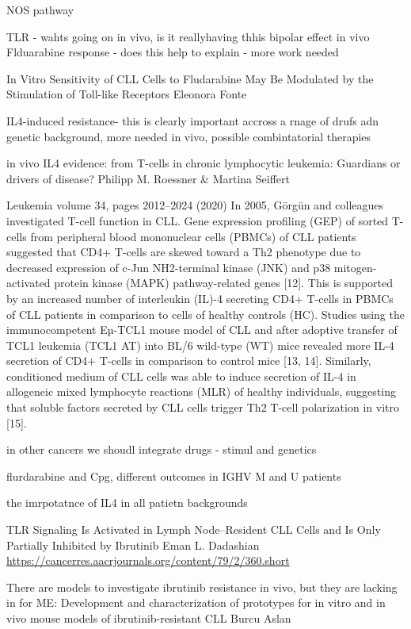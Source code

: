 \documentclass[11pt, a4paper, twosided]{book}
\begin{document}
NOS pathway

TLR - wahts going on in vivo, is it reallyhaving thhis bipolar effect in vivo
Flduarabine response - does this help to explain - more work needed

In Vitro Sensitivity of CLL Cells to Fludarabine May Be Modulated by the Stimulation of Toll-like Receptors
Eleonora Fonte

IL4-induced resistance- this is clearly important accross a rnage of drufs adn genetic background, more needed in vivo, possible combintatorial therapies

in vivo IL4 evidence:
from T-cells in chronic lymphocytic leukemia: Guardians or drivers of disease?
Philipp M. Roessner \& Martina Seiffert

Leukemia volume 34, pages 2012--2024 (2020)
In 2005, Görgün and colleagues investigated T-cell function in CLL. Gene expression profiling (GEP) of sorted T-cells from peripheral blood mononuclear cells (PBMCs) of CLL patients suggested that CD4+ T-cells are skewed toward a Th2 phenotype due to decreased expression of c-Jun NH2-terminal kinase (JNK) and p38 mitogen-activated protein kinase (MAPK) pathway-related genes {[}12{]}. This is supported by an increased number of interleukin (IL)-4 secreting CD4+ T-cells in PBMCs of CLL patients in comparison to cells of healthy controls (HC). Studies using the immunocompetent Eµ-TCL1 mouse model of CLL and after adoptive transfer of TCL1 leukemia (TCL1 AT) into BL/6 wild-type (WT) mice revealed more IL-4 secretion of CD4+ T-cells in comparison to control mice {[}13, 14{]}. Similarly, conditioned medium of CLL cells was able to induce secretion of IL-4 in allogeneic mixed lymphocyte reactions (MLR) of healthy individuals, suggesting that soluble factors secreted by CLL cells trigger Th2 T-cell polarization in vitro {[}15{]}.

in other cancers we shoudl integrate drugs - stimul and genetics

flurdarabine and Cpg, different outcomes in IGHV M and U patients

the imrpotatnce of IL4 in all patietn backgrounds

TLR Signaling Is Activated in Lymph Node--Resident CLL Cells and Is Only Partially Inhibited by Ibrutinib
Eman L. Dadashian
\url{https://cancerres.aacrjournals.org/content/79/2/360.short}

There are models to investigate ibrutinib resistance in vivo, but they are lacking in for ME:
Development and characterization of prototypes for in vitro and in vivo mouse models of ibrutinib-resistant CLL
Burcu Aslan
\end{document}
